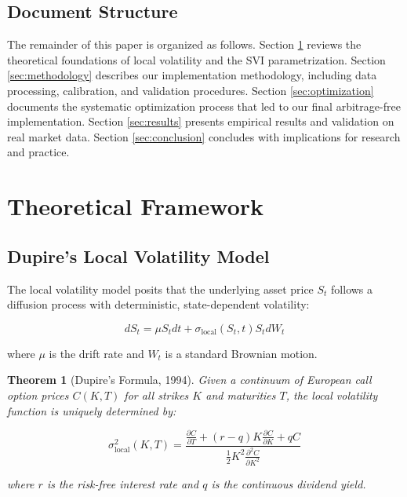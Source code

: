 \documentclass[12pt,a4paper]{article}
\newtheorem{theorem}{Theorem}
\begin{document}
\subsection{Document Structure}

The remainder of this paper is organized as follows. Section \ref{sec:theory} reviews the theoretical foundations of local volatility and the SVI parametrization. Section \ref{sec:methodology} describes our implementation methodology, including data processing, calibration, and validation procedures. Section \ref{sec:optimization} documents the systematic optimization process that led to our final arbitrage-free implementation. Section \ref{sec:results} presents empirical results and validation on real market data. Section \ref{sec:conclusion} concludes with implications for research and practice.

\section{Theoretical Framework}\label{sec:theory}

\subsection{Dupire's Local Volatility Model}

The local volatility model posits that the underlying asset price $S_t$ follows a diffusion process with deterministic, state-dependent volatility:

\begin{equation}
    dS_t = \mu S_t dt + \sigma_{\text{local}}(S_t, t) S_t dW_t
\end{equation}

where $\mu$ is the drift rate and $W_t$ is a standard Brownian motion.

\begin{theorem}[Dupire's Formula, 1994]
Given a continuum of European call option prices $C(K,T)$ for all strikes $K$ and maturities $T$, the local volatility function is uniquely determined by:

\begin{equation}\label{eq:dupire}
    \sigma_{\text{local}}^2(K,T) = \frac{\frac{\partial C}{\partial T} + (r-q)K\frac{\partial C}{\partial K} + qC}{\frac{1}{2}K^2\frac{\partial^2 C}{\partial K^2}}
\end{equation}

where $r$ is the risk-free interest rate and $q$ is the continuous dividend yield.
\end{theorem}
\end{document}
